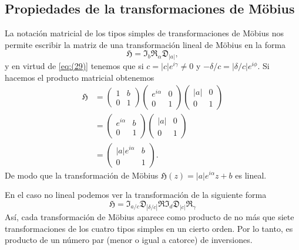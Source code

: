 \documentclass{matematicasud}
\begin{document}
\subsection{Propiedades de la transformaciones de Möbius}\label{cap:3.4}
La notación matricial de los tipos simples de transformaciones de Möbius nos permite escribir la matriz de una transformación lineal de Möbius en la forma
\begin{equation*}
    \mathfrak{H}=\mathfrak{I}_b\mathfrak{R}_\alpha\mathfrak{D}_{|a|},
\end{equation*}
y en virtud de \eqref{eq:(29)} tenemos que si $c=|c|e^{i\gamma}\neq0$ y $-\delta/c=|\delta/c|e^{i\phi}$. Si hacemos el producto matricial obtenemos 
\begin{align*}
    \mathfrak{H}&=
    \begin{pmatrix}
        1 & b\\
        0 & 1
    \end{pmatrix}
    \begin{pmatrix}
        e^{i\alpha} & 0\\
        0 & 1
    \end{pmatrix}
    \begin{pmatrix}
        |a| & 0\\
        0 & 1
    \end{pmatrix}
    \\
    &=
    \begin{pmatrix}
        e^{i\alpha} & b\\
        0 & 1
    \end{pmatrix}
    \begin{pmatrix}
        |a| & 0\\
        0 & 1
    \end{pmatrix}
    \\
    &=
    \begin{pmatrix}
        |a|e^{i\alpha} & b\\
        0 & 1
    \end{pmatrix}.
\end{align*}
De modo que la transformación de Möbius $\mathfrak{H}(z)=|a|e^{i\alpha}z+b$ es lineal.

En el caso no lineal podemos ver la transformación de la siguiente forma
\begin{equation*}
    \mathfrak{H}=\mathfrak{I}_{a/c}\mathfrak{D}_{|\delta/c|}\mathfrak{R}\mathfrak{I}_{d}\mathfrak{D}_{|c|}\mathfrak{R}_{\gamma}
\end{equation*}
Así, cada transformación de Möbius aparece como producto de no más que siete transformaciones de los cuatro tipos simples en un cierto orden. Por lo tanto, es producto de un número par (menor o igual a catorce) de inversiones.
\end{document}
